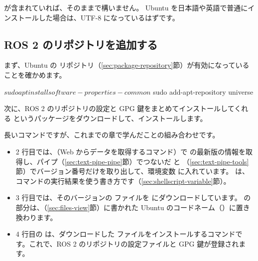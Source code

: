 が含まれていれば、そのままで構いません。
Ubuntu を日本語や英語で普通にインストールした場合は、UTF-8 になっているはずです。

\subsection{ROS 2 のリポジトリを追加する}

まず、Ubuntu の  リポジトリ（\ref{sec:package-repository}節）が有効になっていることを確かめます。

\begin{terminal}
$ sudo apt install software-properties-common
$ sudo add-apt-repository universe
\end{terminal}

次に、ROS 2 のリポジトリの設定と GPG 鍵をまとめてインストールしてくれる  というパッケージをダウンロードして、インストールします。


長いコマンドですが、これまでの章で学んだことの組み合わせです。

\begin{itemize}
  \item 2 行目では、（Web からデータを取得するコマンド）で  の最新版の情報を取得し、パイプ（\ref{sec:text-pipe-pipe}節）でつないだ  と （\ref{sec:text-pipe-tools}節）でバージョン番号だけを取り出して、環境変数  に入れています。 は、コマンドの実行結果を使う書き方です（\ref{sec:shellscript-variable}節）。
  \item 3 行目では、そのバージョンの  ファイルを  にダウンロードしています。 の部分は、（\ref{sec:files-view}節）に書かれた Ubuntu のコードネーム（）に置き換わります。
  \item 4 行目の  は、ダウンロードした  ファイルをインストールするコマンドです。これで、ROS 2 のリポジトリの設定ファイルと GPG 鍵が登録されます。
\end{itemize}

